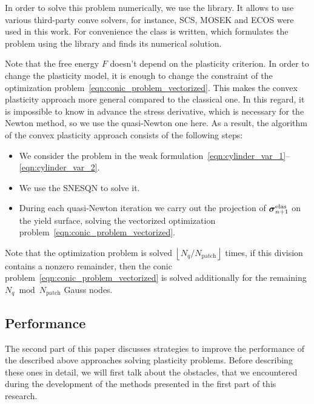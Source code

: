 \documentclass[12pt]{article}
\begin{document}
In order to solve this problem numerically, we use the  library. It allows to use various third-party conve solvers, for instance, SCS, MOSEK and ECOS were used in this work. For convenience the  class is written, which formulates the problem using the  library and finds its numerical solution.

Note that the free energy $F$ doesn't depend on the plasticity criterion. In order to change the plasticity model, it is enough to change the constraint of the optimization problem~\eqref{eqn:conic_problem_vectorized}. This makes the convex plasticity approach more general compared to the classical one. In this regard, it is impossible to know in advance the stress derivative, which is necessary for the Newton method, so we use the quasi-Newton one here. As a result, the algorithm of the convex plasticity approach consists of the following steps:
\begin{itemize}
    \item We consider the problem in the weak formulation~\eqref{eqn:cylinder_var_1}--\eqref{eqn:cylinder_var_2}.
    \item We use the SNESQN  to solve it.
    \item During each quasi-Newton iteration we carry out the projection of $\mbox{\boldmath$\sigma$}^\text{elas}_{n+1}$ on the yield surface, solving the vectorized optimization problem~\eqref{eqn:conic_problem_vectorized}.
\end{itemize}
Note that the optimization problem is solved $\left\lfloor N_q / N_\text{patch}\right\rfloor$ times, if this division contains a nonzero remainder, then the conic problem~\eqref{eqn:conic_problem_vectorized} is solved additionally for the remaining $N_q \bmod N_\text{patch}$ Gauss nodes. 

\subsection{Performance}

The second part of this paper discusses strategies to improve the performance of the described above approaches solving plasticity problems. Before describing these ones in detail, we will first talk about the obstacles, that we encountered during the development of the methods presented in the first part of this research. 

\end{document}
